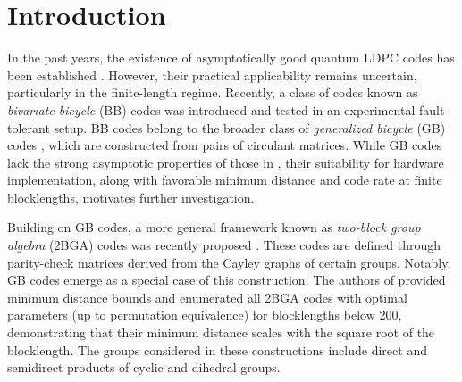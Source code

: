\documentclass[a4paper,twocolumn,11pt,accepted=2026-05-03]{quantumarticle}
\begin{document}
\section{Introduction}


In the past years, the existence of asymptotically good quantum LDPC codes has been established \cite{panteleev_asymptotically_2022,leverrier_quantum_2022,dinur_good_2023}. However, their practical applicability remains uncertain, particularly in the finite-length regime. Recently, a class of codes known as \textit{bivariate bicycle} (BB) codes \cite{bravyi2024high} was introduced and tested in an experimental fault-tolerant setup. BB codes belong to the broader class of \textit{generalized bicycle} (GB) codes \cite{pryadko2022gb}, which are constructed from pairs of circulant matrices. While GB codes lack the strong asymptotic properties of those in \cite{panteleev_asymptotically_2022,leverrier_quantum_2022,dinur_good_2023}, their suitability for hardware implementation, along with favorable minimum distance and code rate at finite blocklengths, motivates further investigation.

Building on GB codes, a more general framework known as \textit{two-block group algebra} (2BGA) codes was recently proposed \cite{pryadko2024twoblock}. These codes are defined through parity-check matrices derived from the Cayley graphs of certain groups. Notably, GB codes emerge as a special case of this construction. The authors of \cite{pryadko2024twoblock} provided minimum distance bounds and enumerated all 2BGA codes with optimal parameters (up to permutation equivalence) for blocklengths below 200, demonstrating that their minimum distance scales with the square root of the blocklength. The groups considered in these constructions include direct and semidirect products of cyclic and dihedral groups.
\end{document}
